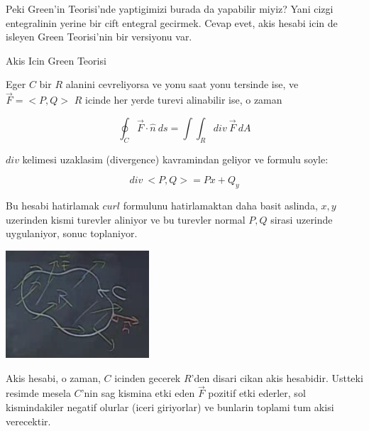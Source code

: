 \documentclass[12pt,fleqn]{article}
\begin{document}
Peki Green'in Teorisi'nde yaptigimizi burada da yapabilir miyiz? Yani cizgi
entegralinin yerine bir cift entegral gecirmek. Cevap evet, akis hesabi
icin de isleyen Green Teorisi'nin bir versiyonu var. 

Akis Icin Green Teorisi

Eger $C$ bir $R$ alanini cevreliyorsa ve yonu saat yonu tersinde ise, ve
$\vec{F}=<P,Q>$ $R$ icinde her yerde turevi alinabilir ise, o zaman 

\[ \oint_C \vec{F} \cdot \hat{n} \ ds = 
\int \int_R div \ \vec{F} \ dA
\]

$div$ kelimesi uzaklasim (divergence) kavramindan geliyor ve formulu soyle:

\[ div \ <P,Q> = Px + Q_y \]

Bu hesabi hatirlamak $curl$ formulunu hatirlamaktan daha basit aslinda,
$x,y$ uzerinden kismi turevler aliniyor ve bu turevler normal $P,Q$ sirasi
uzerinde uygulaniyor, sonuc toplaniyor. 

\includegraphics[height=4cm]{23_8.png}

Akis hesabi, o zaman, $C$ icinden gecerek $R$'den disari cikan akis
hesabidir. Ustteki resimde mesela $C$'nin sag kismina etki eden $\vec{F}$
pozitif etki ederler, sol kismindakiler negatif olurlar (iceri giriyorlar)
ve bunlarin toplami tum akisi verecektir. 
\end{document}
